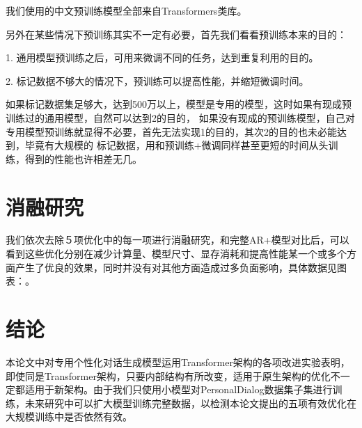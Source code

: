\documentclass[letterpaper]{article} %
\DeclareRobustCommand{\citeext}[1]{\cite[#1]{#1}}
\begin{document}
\begin{CJK*}{UTF8}{gbsn}
我们使用的中文预训练模型全部来自Transformers类库\citeext{Wolf2019HuggingFacesTS}。

另外在某些情况下预训练其实不一定有必要，首先我们看看预训练本来的目的：

1. 通用模型预训练之后，可用来微调不同的任务，达到重复利用的目的。

2. 标记数据不够大的情况下，预训练可以提高性能，并缩短微调时间。

如果标记数据集足够大，达到500万以上，模型是专用的模型，这时如果有现成预训练过的通用模型，自然可以达到2的目的，
如果没有现成的预训练模型，自己对专用模型预训练就显得不必要，首先无法实现1的目的，其次2的目的也未必能达到，毕竟有大规模的
标记数据，用和预训练+微调同样甚至更短的时间从头训练，得到的性能也许相差无几。


\section[Ablation Study]{消融研究} 
我们依次去除５项优化中的每一项进行消融研究，和完整AR+模型对比后，可以看到这些优化分别在减少计算量、模型尺寸、显存消耗和提高性能某一个或多个方面产生了优良的效果，同时并没有对其他方面造成过多负面影响，具体数据见图表：。

\section[Conclusion]{结论} 
本论文中对专用个性化对话生成模型运用Transformer架构的各项改进实验表明，即使同是Transformer架构，只要内部结构有所改变，适用于原生架构的优化不一定都适用于新架构。由于我们只使用小模型对PersonalDialog数据集子集进行训练，未来研究中可以扩大模型训练完整数据，以检测本论文提出的五项有效优化在大规模训练中是否依然有效。




\clearpage\end{CJK*}
\end{document}

